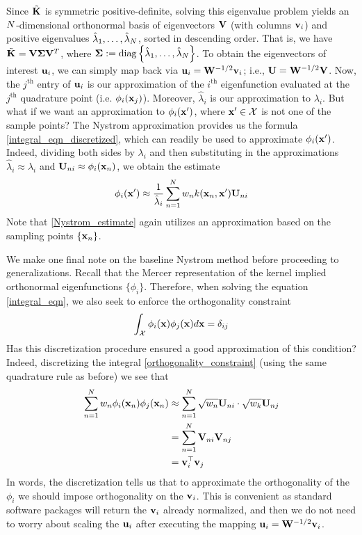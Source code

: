 \documentclass[12pt]{article}
\begin{document}
Since $\tilde{\mathbf{K}_{}}$ is symmetric positive-definite, solving this eigenvalue problem yields an $N$-dimensional orthonormal basis of 
eigenvectors $\mathbf{V}$ (with columns $\mathbf{v}_i$) and positive eigenvalues $\hat{\lambda}_1, \dots, \hat{\lambda}_{N}$, sorted in descending 
order. That is, we have $\tilde{\mathbf{K}_{}} = \mathbf{V} \boldsymbol{\Sigma} \mathbf{V}^T$, where $\boldsymbol{\Sigma} := \text{diag}\left\{\hat{\lambda}_1, \dots, \hat{\lambda}_{N} \right\}$. 
To obtain the eigenvectors of interest $\mathbf{u}_i$, we can simply map back via $\mathbf{u}_i = \mathbf{W}^{-1/2}\mathbf{v}_i$; i.e., $\mathbf{U} = \mathbf{W}^{-1/2}\mathbf{V}$. Now, 
the $j^{\text{th}}$ entry of $\mathbf{u}_i$ is our approximation of the $i^{\text{th}}$ eigenfunction evaluated at the $j^{\text{th}}$ quadrature
point (i.e. $\phi_i(\mathbf{x}_j)$). Moreover, $\hat{\lambda}_i$ is our approximation to $\lambda_i$. But what if we want an approximation to 
$\phi_i(\mathbf{x}^\prime)$, where $\mathbf{x}^\prime \in \mathcal{X}$ is not one of the sample points? The Nystrom approximation provides us the formula 
\ref{integral_eqn_discretized}, which can readily be used to approximate $\phi_i(\mathbf{x}^\prime)$. Indeed, dividing both sides by $\lambda_i$ and then substituting in the 
approximations $\hat{\lambda}_i \approx \lambda_i$ and $ \mathbf{U}_{n i} \approx \phi_i(\mathbf{x}_n)$, we obtain the estimate
\begin{align}
\phi_i(\mathbf{x}^\prime) \approx \frac{1}{\hat{\lambda}_i } \sum_{n = 1}^{N} w_{n} k(\mathbf{x}_{n}, \mathbf{x}^\prime)  \mathbf{U}_{n i} \label{Nystrom_estimate}
\end{align}
Note that \ref{Nystrom_estimate} again utilizes an approximation based on the sampling points $\{\mathbf{x}_{n}\}$.

We make one final note on the baseline Nystrom method before proceeding to generalizations. Recall that the Mercer representation of the kernel implied 
orthonormal eigenfunctions $\{\phi_i\}$. Therefore, when solving the equation \ref{integral_eqn}, we also seek to enforce the 
orthogonality constraint 
\begin{align}
\int_{\mathcal{X}} \phi_i(\mathbf{x}) \phi_j(\mathbf{x}) d\mathbf{x} = \delta_{ij} \label{orthogonality_constraint}
\end{align}
Has this discretization procedure ensured a good approximation of this condition? Indeed, discretizing the integral \ref{orthogonality_constraint} (using the 
same quadrature rule as before) we see that
\begin{align*}
\sum_{n = 1}^{N} w_{n} \phi_i(\mathbf{x}_{n}) \phi_j(\mathbf{x}_{n}) &\approx \sum_{n = 1}^{N} \sqrt{w_{n}} \mathbf{U}_{n i}\cdot \sqrt{w_k} \mathbf{U}_{n j}\\
								   &=  \sum_{n = 1}^{N} \mathbf{V}_{n i} \mathbf{V}_{n j} \\
								   &= \mathbf{v}_i^{\top} \mathbf{v}_j
\end{align*}
In words, the discretization tells us that to approximate the orthogonality of the $\phi_i$ we should impose orthogonality on the $\mathbf{v}_i$. This
is convenient as standard software packages will return the $\mathbf{v}_i$ already normalized, and then we do not need to worry about scaling the 
$\mathbf{u}_i$ after executing the mapping $\mathbf{u}_i = \mathbf{W}^{-1/2}\mathbf{v}_i$.   
\end{document}
